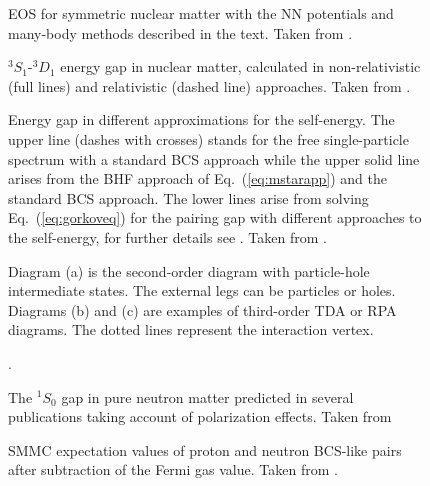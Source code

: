 \documentclass[preprint,rmp,aps,floatfix]{revtex4}
\begin{document}
\begin{figure}
%
    \caption{EOS for symmetric nuclear matter with the NN potentials 
 and many-body methods described in the text. Taken from \cite{eeho98}.}
    \label{fig:figprc58_1}
\end{figure}

\begin{figure}
%
    \caption{$^3S_1$-$^3D_1$ energy gap in nuclear matter, calculated in 
  non-relativistic (full lines) and relativistic 
 (dashed line) approaches. Taken from \cite{eeho98}. }
    \label{fig:figprc58_2}
\end{figure} 

\begin{figure}
\caption{Energy gap in different approximations for the self-energy. 
The upper line (dashes with crosses)  
stands for the free single-particle spectrum with a standard BCS approach
while the upper solid line
arises from the BHF approach of Eq.~(\ref{eq:mstarapp})
and the standard BCS approach. The lower lines arise from solving 
Eq.~(\ref{eq:gorkoveq}) for the pairing gap with different 
approaches to the self-energy, for further details see \cite{lsz2001,ls2000}. Taken from \cite{lsz2001,ls2000}.
\label{fig:lombardo2001}}
\end{figure} 

\begin{figure}
\caption{Diagram (a) is the 
second-order diagram with particle-hole intermediate states. 
The external legs can be particles or holes. Diagrams (b) and (c) are examples
of third-order TDA or RPA diagrams. 
The dotted lines represent the interaction vertex.\label{fig:secondordercorelpol}}
\end{figure} 

\begin{figure}
\caption{The $^1S_0$ gap in pure neutron matter 
predicted in several publications
taking account of polarization effects.
Taken from \cite{ls2000}\label{fig:screening}}.
\end{figure}


\begin{figure}
\caption{SMMC expectation values of proton and neutron BCS-like pairs after
subtraction of the Fermi gas value. Taken from  \protect\cite{Langanke95}.}
\label{bcs_pairs}
\end{figure}
\end{document}
